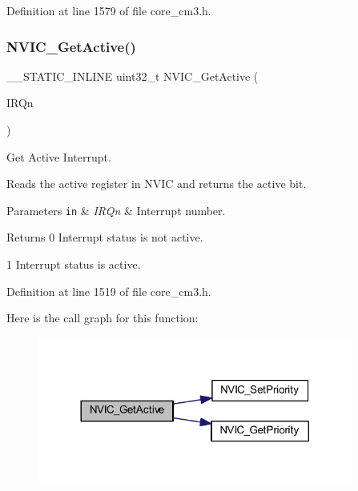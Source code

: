 Definition at line 1579 of file core\+\_\+cm3.\+h.

\mbox{\label{group___c_m_s_i_s___core___n_v_i_c_functions_ga47a0f52794068d076c9147aa3cb8d8a6}} 
\subsubsection{\texorpdfstring{N\+V\+I\+C\+\_\+\+Get\+Active()}{NVIC\_GetActive()}}
{\footnotesize\ttfamily \+\_\+\+\_\+\+S\+T\+A\+T\+I\+C\+\_\+\+I\+N\+L\+I\+NE uint32\+\_\+t N\+V\+I\+C\+\_\+\+Get\+Active (\begin{DoxyParamCaption}\item[{\hyperlink{group___configuration__section__for___c_m_s_i_s_gac3af4a32370fb28c4ade8bf2add80251}{I\+R\+Qn\+\_\+\+Type}}]{I\+R\+Qn }\end{DoxyParamCaption})}



Get Active Interrupt. 

Reads the active register in N\+V\+IC and returns the active bit. 
\begin{DoxyParams}[1]{Parameters}
\mbox{\tt in}  & {\em I\+R\+Qn} & Interrupt number. \\
\hline
\end{DoxyParams}
\begin{DoxyReturn}{Returns}
0 Interrupt status is not active. 

1 Interrupt status is active. 
\end{DoxyReturn}


Definition at line 1519 of file core\+\_\+cm3.\+h.

Here is the call graph for this function\+:
\nopagebreak
\begin{figure}[H]
\begin{center}
\leavevmode
\includegraphics[width=293pt]{group___c_m_s_i_s___core___n_v_i_c_functions_ga47a0f52794068d076c9147aa3cb8d8a6_cgraph}
\end{center}
\end{figure}
\mbox{\label{group___c_m_s_i_s___core___n_v_i_c_functions_gafec8042db64c0f8ed432b6c8386a05d8}} 
